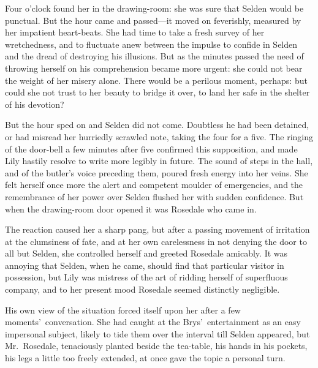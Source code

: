 \documentclass[12pt,a4paper]{book}
\begin{document}
Four o'clock found her in the drawing-room: she was sure that
Selden would be punctual. But the hour came and passed---it moved
on feverishly, measured by her impatient heart-beats. She had
time to take a fresh survey of her wretchedness, and to fluctuate
anew between the impulse to confide in Selden and the dread of
destroying his illusions. But as the minutes passed the need of
throwing herself on his comprehension became more urgent: she
could not bear the weight of her misery alone. There would be a
perilous moment, perhaps: but could she not trust to her
beauty to bridge it over, to land her safe in the shelter of his
devotion?





But the hour sped on and Selden did not come. Doubtless he had
been detained, or had misread her hurriedly scrawled note, taking
the four for a five. The ringing of the door-bell a few minutes
after five confirmed this supposition, and made Lily hastily
resolve to write more legibly in future. The sound of steps in
the hall, and of the butler's voice preceding them, poured fresh
energy into her veins. She felt herself once more the alert and
competent moulder of emergencies, and the remembrance of her
power over Selden flushed her with sudden confidence. But when
the drawing-room door opened it was Rosedale who came in.





The reaction caused her a sharp pang, but after a passing
movement of irritation at the clumsiness of fate, and at her own
carelessness in not denying the door to all but Selden, she
controlled herself and greeted Rosedale amicably. It was annoying
that Selden, when he came, should find that particular visitor in
possession, but Lily was mistress of the art of ridding herself
of superfluous company, and to her present mood Rosedale seemed
distinctly negligible.





His own view of the situation forced itself upon her after a few
moments'\ conversation. She had caught at the Brys'\ entertainment
as an easy impersonal subject, likely to tide them over the
interval till Selden appeared, but Mr.\ Rosedale, tenaciously
planted beside the tea-table, his hands in his pockets, his legs
a little too freely extended, at once gave the topic a personal
turn.
\end{document}
